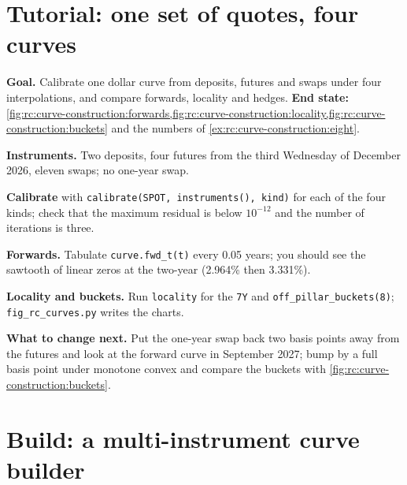 \section{Tutorial: one set of quotes, four curves}\label{tut:rc:curve-construction:tutorial}

\begin{tutorial}
\textbf{Goal.} Calibrate one dollar curve from deposits, futures and swaps
under four interpolations, and compare forwards, locality and hedges.
\textbf{End state:}
\cref{fig:rc:curve-construction:forwards,fig:rc:curve-construction:locality,fig:rc:curve-construction:buckets}
and the numbers of \cref{ex:rc:curve-construction:eight}.
\begin{tutsteps}
\item \textbf{Instruments.} Two deposits, four futures from the third
Wednesday of December 2026, eleven swaps; no one-year swap.
\label{lst:rc:curve-construction:instruments}
\item \textbf{Calibrate} with \texttt{calibrate(SPOT, instruments(), kind)} for each
of the four kinds; check that the maximum residual is below $10^{-12}$ and the
number of iterations is three.
\item \textbf{Forwards.} Tabulate \texttt{curve.fwd\_t(t)} every 0.05 years; you
should see the sawtooth of linear zeros at the two-year  (2.964\% then
3.331\%).
\item \textbf{Locality and buckets.} Run \texttt{locality} for the  \texttt{7Y} and
\texttt{off\_pillar\_buckets(8)}; \texttt{fig\_rc\_curves.py} writes the charts.
\end{tutsteps}
\textbf{What to change next.} Put the one-year swap back two basis points
away from the futures and look at the forward curve in September 2027; bump by a full basis point
under monotone convex and compare the buckets with
\cref{fig:rc:curve-construction:buckets}.
\end{tutorial}

\section{Build: a multi-instrument curve builder}\label{bld:rc:curve-construction:curvebuild}


